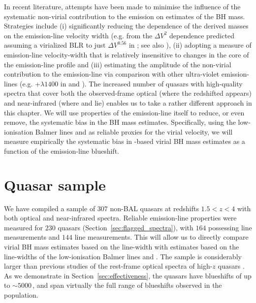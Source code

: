 In recent literature, attempts have been made to minimise the influence of the systematic non-virial contribution to the  emission on estimates of the BH mass. 
Strategies include (i) significantly reducing the dependence of the derived masses on the emission-line velocity width (e.g. from the $\Delta V^2$ dependence predicted assuming a virialized BLR to just $\Delta V^{0.56}$ in \citealt{park13}; see also \citealt{shen12}), (ii) adopting a measure of emission-line velocity-width that is relatively insensitive to changes in the core of the emission-line profile \citep[e.g.][]{denney13} and (iii) estimating the amplitude of the non-virial contribution to the  emission-line via comparison with other ultra-violet emission-lines (e.g. +$\lambda$$1400$ in \citealt{runnoe13} and \citealt{brotherton15}).
The increased number of quasars with high-quality spectra that cover both the observed-frame optical (where the redshifted  appears) and near-infrared (where \hb and \ha lie) enables us to take a rather different approach in this chapter.
We will use properties of the  emission-line itself to reduce, or even remove, the systematic bias in the BH mass estimates. 
Specifically, using the low-ionisation Balmer lines \ha and \hb as reliable proxies for the virial velocity, we will measure empirically the systematic bias in -based virial BH mass estimates as a function of the  emission-line blueshift.

\section{Quasar sample}

We have compiled a sample of $307$ non-BAL quasars at redshifts $1.5 < z < 4$ with both optical and near-infrared spectra.  
Reliable emission-line properties were measured for $230$ quasars (Section~\ref{sec:flagged_spectra}), with $164$ possessing \ha line measurements and $144$ \hb line measurements.  
This will allow us to directly compare virial BH mass estimates based on the  line-width with estimates based on the line-widths of the low-ionisation Balmer lines \ha and \hbns.  
The sample is considerably larger than previous studies of the rest-frame optical spectra of high-$z$ quasars \citep[e.g.][]{shen12}. 
As we demonstrate in Section~\ref{sec:effectiveness}, the quasars have  blueshifts of up to $\sim5000$\,\kms, and span virtually the full range of blueshifts observed in the population. 


